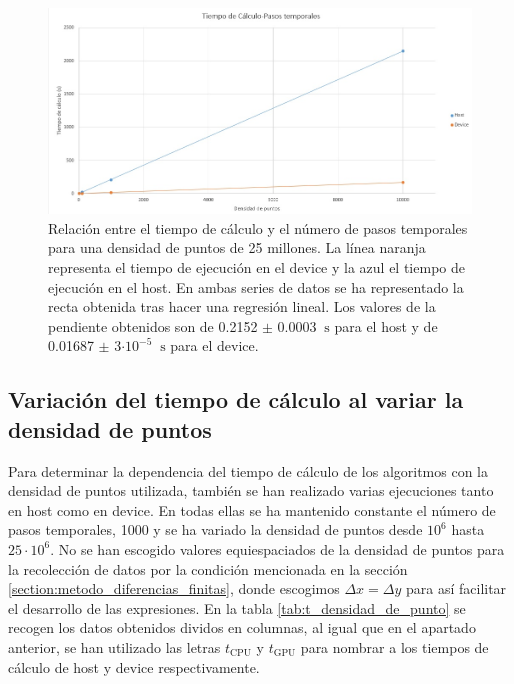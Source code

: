 \documentclass[11pt,a4paper,twoside,pdf]{article}
\numberwithin{equation}{section}
\begin{document}
\begin{figure}[h]
\centering
\includegraphics[width=15 cm]{T-Pasos_temporales.jpg}				
\caption{Relación entre el tiempo de cálculo y el número de pasos temporales para una densidad de puntos de 25 millones. La línea naranja representa el tiempo de ejecución en el device y la azul el tiempo de ejecución en el host. En ambas series de datos se ha representado la recta obtenida tras hacer una regresión lineal. Los valores de la pendiente obtenidos son de 0.2152 $\pm$ 0.0003 $\SI{}{\second}$ para el host y de 0.01687 $\pm$ 3$\cdot 10^{-5}$ $\SI{}{\second}$ para el device.}
\label{fig:t-pasos_temporales}
\end{figure}
\noindent






\subsection{Variación del tiempo de cálculo al variar la densidad de puntos} \label{subsection: Variacion densidad de puntos}

Para determinar la dependencia del tiempo  de cálculo de los algoritmos con la densidad de puntos utilizada, también se han realizado varias ejecuciones tanto en host como en device. En todas ellas se ha mantenido constante el número de pasos temporales, 1000 y se ha variado la densidad de puntos desde $10^6$ hasta $25\cdot 10^6$. No se han escogido valores equiespaciados de la densidad de puntos para la recolección de datos por la condición mencionada en la sección \ref{section:metodo_diferencias_finitas}, donde escogimos $\Delta x=\Delta y$ para así facilitar el desarrollo de las expresiones. En la tabla \ref{tab:t_densidad_de_punto} se recogen los datos obtenidos dividos en columnas, al igual que en el apartado anterior, se han utilizado las letras  $t_\text{CPU}$ y  $t_\text{GPU}$ para nombrar a los tiempos de cálculo de host y device respectivamente. 
\end{document}
